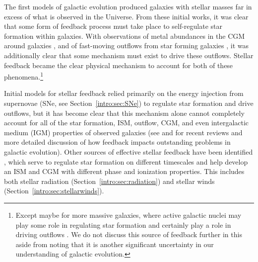 The first models of galactic evolution produced galaxies with stellar masses far in excess of what is observed in the Universe.
From these initial works, it was clear that some form of feedback process must take place to self-regulate star formation within galaxies. With observations of metal abundances in the CGM around galaxies \citep[see][ for a recent review]{Tumlinson2017}, and of fast-moving outflows from star forming galaxies \citep[see][ for a review]{Veilleux2005}, it was additionally clear that some mechanism must exist to drive these outflows. Stellar feedback became the clear physical mechanism to account for both of these phenomena.\footnote{Except maybe for more massive galaxies, where active galactic nuclei may play some role in regulating star formation and certainly play a role in driving outflows \citep[e.g.][]{Fabian2012}. We do not discuss this source of feedback further in this \dissertation aside from noting that it is another significant uncertainty in our understanding of galactic evolution.}

Initial models for stellar feedback relied primarily on the energy injection from supernovae (SNe, see Section~\ref{intro:sec:SNe}) to regulate star formation and drive outflows, but it has become clear that this mechanism alone cannot completely account for all of the star formation, ISM, outflow, CGM, and even intergalactic medium (IGM) properties of observed galaxies (see \cite{SomervilleDave2015} and \cite{NaabOstriker2017} for recent reviews and more detailed discussion of how feedback impacts outstanding problems in galactic evolution). Other sources of effective stellar feedback have been identified \citep[e.g.][]{Agertz2013}, which serve to regulate star formation on different timescales and help develop an ISM and CGM with different phase and ionization properties. This includes both stellar radiation (Section~\ref{intro:sec:radiation}) and stellar winds (Section~\ref{intro:sec:stellarwinds}).

